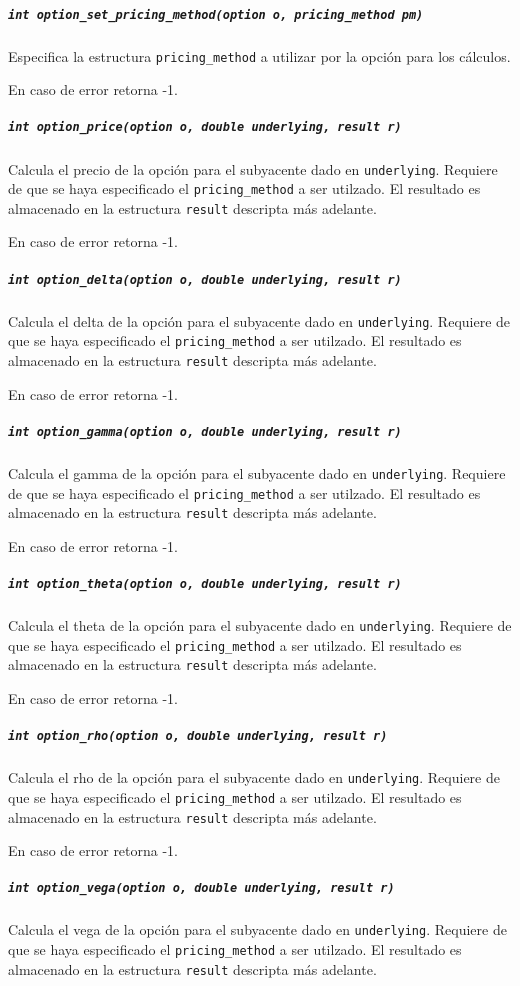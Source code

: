 \documentclass[12pt,a4paper,final]{article}
\begin{document}
			\subparagraph{\texttt{int option\_set\_pricing\_method(option o, pricing\_method pm)}}
				Especifica la estructura \texttt{pricing\_method} a utilizar por la opción para
				los cálculos.

				En caso de error retorna -1.

			\subparagraph{\texttt{int option\_price(option o, double underlying, result r)}}
				Calcula el precio de la opción para el subyacente dado en \texttt{underlying}.
				Requiere de que se haya especificado el \texttt{pricing\_method} a ser utilzado.
				El resultado es almacenado en la estructura \texttt{result} descripta más adelante.

				En caso de error retorna -1.

			\subparagraph{\texttt{int option\_delta(option o, double underlying, result r)}}
				Calcula el delta de la opción para el subyacente dado en \texttt{underlying}.
				Requiere de que se haya especificado el \texttt{pricing\_method} a ser utilzado.
				El resultado es almacenado en la estructura \texttt{result} descripta más adelante.

				En caso de error retorna -1.

			\subparagraph{\texttt{int option\_gamma(option o, double underlying, result r)}}
				Calcula el gamma de la opción para el subyacente dado en \texttt{underlying}.
				Requiere de que se haya especificado el \texttt{pricing\_method} a ser utilzado.
				El resultado es almacenado en la estructura \texttt{result} descripta más adelante.

				En caso de error retorna -1.

			\subparagraph{\texttt{int option\_theta(option o, double underlying, result r)}}
				Calcula el theta de la opción para el subyacente dado en \texttt{underlying}.
				Requiere de que se haya especificado el \texttt{pricing\_method} a ser utilzado.
				El resultado es almacenado en la estructura \texttt{result} descripta más adelante.

				En caso de error retorna -1.

			\subparagraph{\texttt{int option\_rho(option o, double underlying, result r)}}
				Calcula el rho de la opción para el subyacente dado en \texttt{underlying}.
				Requiere de que se haya especificado el \texttt{pricing\_method} a ser utilzado.
				El resultado es almacenado en la estructura \texttt{result} descripta más adelante.

				En caso de error retorna -1.

			\subparagraph{\texttt{int option\_vega(option o, double underlying, result r)}}
				Calcula el vega de la opción para el subyacente dado en \texttt{underlying}.
				Requiere de que se haya especificado el \texttt{pricing\_method} a ser utilzado.
				El resultado es almacenado en la estructura \texttt{result} descripta más adelante.
\end{document}
